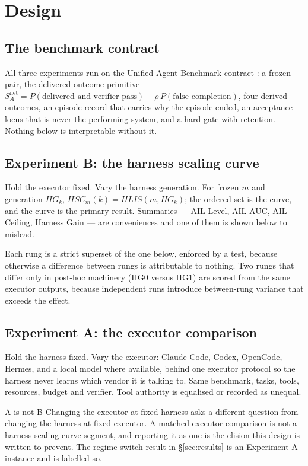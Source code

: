 \section{Design}\label{sec:design}

\subsection{The benchmark contract}

All three experiments run on the Unified Agent Benchmark contract \citep{yang2026uab}: a frozen pair, the delivered-outcome primitive $S^{\text{net}}_A = P(\text{delivered and verifier pass}) - \rho\,P(\text{false completion})$, four derived outcomes, an episode record that carries why the episode ended, an acceptance locus that is never the performing system, and a hard gate with retention. Nothing below is interpretable without it.

\subsection{Experiment B: the harness scaling curve}

Hold the executor fixed. Vary the harness generation. For frozen $m$ and generation $HG_k$, $HSC_m(k) = HLIS(m, HG_k)$; the ordered set is the curve, and the curve is the primary result. Summaries --- AIL-Level, AIL-AUC, AIL-Ceiling, Harness Gain --- are conveniences and one of them is shown below to mislead.

Each rung is a strict superset of the one below, enforced by a test, because otherwise a difference between rungs is attributable to nothing. Two rungs that differ only in post-hoc machinery (HG0 versus HG1) are scored from the same executor outputs, because independent runs introduce between-rung variance that exceeds the effect.

\subsection{Experiment A: the executor comparison}

Hold the harness fixed. Vary the executor: Claude Code, Codex, OpenCode, Hermes, and a local model where available, behind one executor protocol so the harness never learns which vendor it is talking to. Same benchmark, tasks, tools, resources, budget and verifier. Tool authority is equalised or recorded as unequal.

\begin{cautionbox}{A is not B}
Changing the executor at fixed harness asks a different question from changing the harness at fixed executor. A matched executor comparison is not a harness scaling curve segment, and reporting it as one is the elision this design is written to prevent. The regime-switch result in \S\ref{sec:results} is an Experiment A instance and is labelled so.
\end{cautionbox}

